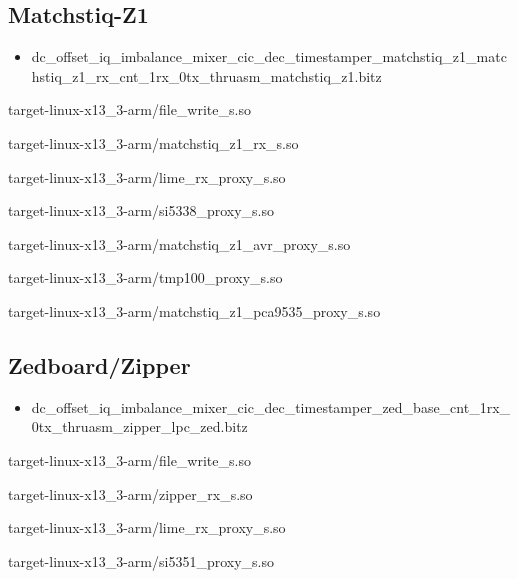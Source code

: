 \subsection{Matchstiq-Z1}
	\begin{itemize}
	\item
dc\_offset\_iq\_imbalance\_mixer\_cic\_dec\_timestamper\_matchstiq\_z1\_matchstiq\_z1\_rx\_cnt\_1rx\_0tx\_thruasm\_matchstiq\_z1.bitz
	\end{itemize}
	\begin{itemize}
	\begin{minipage}[t]{.5\textwidth}
	\item target-linux-x13\_3-arm/file\_write\_s.so
	\item target-linux-x13\_3-arm/matchstiq\_z1\_rx\_s.so
	\item target-linux-x13\_3-arm/lime\_rx\_proxy\_s.so
	\end{minipage}
	\begin{minipage}[t]{.5\textwidth}
	\item target-linux-x13\_3-arm/si5338\_proxy\_s.so
	\item target-linux-x13\_3-arm/matchstiq\_z1\_avr\_proxy\_s.so
	\item target-linux-x13\_3-arm/tmp100\_proxy\_s.so
	\item target-linux-x13\_3-arm/matchstiq\_z1\_pca9535\_proxy\_s.so
	\end{minipage}
	\end{itemize}
\subsection{Zedboard/Zipper}
	\begin{itemize}
	\item
dc\_offset\_iq\_imbalance\_mixer\_cic\_dec\_timestamper\_zed\_base\_cnt\_1rx\_0tx\_thruasm\_zipper\_lpc\_zed.bitz
	\end{itemize}
	\begin{itemize}
	\begin{minipage}[t]{.5\textwidth}
	\item target-linux-x13\_3-arm/file\_write\_s.so
	\item target-linux-x13\_3-arm/zipper\_rx\_s.so
	\end{minipage}
	\begin{minipage}[t]{.5\textwidth}
	\item target-linux-x13\_3-arm/lime\_rx\_proxy\_s.so
	\item target-linux-x13\_3-arm/si5351\_proxy\_s.so
	\end{minipage}
	\end{itemize}
